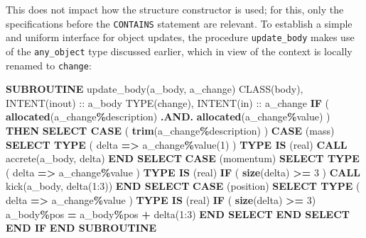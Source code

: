 \documentclass[
  paper=a4,
  ,captions=tableheading
]{scrartcl}
\newenvironment{Shaded}{\begin{snugshade}}{\end{snugshade}}
\newcommand{\DataTypeTok}[1]{\textcolor[rgb]{0.13,0.29,0.53}{#1}}
\newcommand{\DecValTok}[1]{\textcolor[rgb]{0.00,0.00,0.81}{#1}}
\newcommand{\FunctionTok}[1]{\textcolor[rgb]{0.13,0.29,0.53}{\textbf{#1}}}
\newcommand{\KeywordTok}[1]{\textcolor[rgb]{0.13,0.29,0.53}{\textbf{#1}}}
\newcommand{\NormalTok}[1]{#1}
\newcommand{\OperatorTok}[1]{\textcolor[rgb]{0.81,0.36,0.00}{\textbf{#1}}}
\newcommand{\StringTok}[1]{\textcolor[rgb]{0.31,0.60,0.02}{#1}}
\begin{document}
This does not impact how the structure constructor is used; for this,
only the specifications before the \texttt{CONTAINS} statement are
relevant. To establish a simple and uniform interface for object
updates, the procedure \texttt{update\_body} makes use of the
\texttt{any\_object} type discussed earlier, which in view of the
context is locally renamed to \texttt{change}:

\begin{Shaded}
\begin{Highlighting}[]
\KeywordTok{SUBROUTINE}\NormalTok{ update\_body(a\_body, a\_change)}
   \DataTypeTok{CLASS(body)}\NormalTok{, }\DataTypeTok{INTENT(inout)} \DataTypeTok{::}\NormalTok{ a\_body}
   \DataTypeTok{TYPE(change)}\NormalTok{, }\DataTypeTok{INTENT(in)} \DataTypeTok{::}\NormalTok{ a\_change}
   \KeywordTok{IF}\NormalTok{ ( }\FunctionTok{allocated}\NormalTok{(a\_change}\OperatorTok{\%}\NormalTok{description) }\OperatorTok{.AND.} \FunctionTok{allocated}\NormalTok{(a\_change}\OperatorTok{\%}\DataTypeTok{value}\NormalTok{) ) }\KeywordTok{THEN}
     \KeywordTok{SELECT CASE}\NormalTok{ ( }\FunctionTok{trim}\NormalTok{(a\_change}\OperatorTok{\%}\NormalTok{description) )}
     \KeywordTok{CASE}\NormalTok{ (}\StringTok{\textquotesingle{}mass\textquotesingle{}}\NormalTok{)}
        \KeywordTok{SELECT TYPE}\NormalTok{ ( delta }\KeywordTok{=}\OperatorTok{\textgreater{}}\NormalTok{ a\_change}\OperatorTok{\%}\DataTypeTok{value}\NormalTok{(}\DecValTok{1}\NormalTok{) )}
        \KeywordTok{TYPE IS}\NormalTok{ (}\DataTypeTok{real}\NormalTok{)}
           \KeywordTok{CALL}\NormalTok{ accrete(a\_body, delta)}
        \KeywordTok{END SELECT}
     \KeywordTok{CASE}\NormalTok{ (}\StringTok{\textquotesingle{}momentum\textquotesingle{}}\NormalTok{)}
        \KeywordTok{SELECT TYPE}\NormalTok{ ( delta }\KeywordTok{=}\OperatorTok{\textgreater{}}\NormalTok{ a\_change}\OperatorTok{\%}\DataTypeTok{value}\NormalTok{ )}
        \KeywordTok{TYPE IS}\NormalTok{ (}\DataTypeTok{real}\NormalTok{)}
           \KeywordTok{IF}\NormalTok{ ( }\FunctionTok{size}\NormalTok{(delta) }\OperatorTok{\textgreater{}=} \DecValTok{3}\NormalTok{ ) }\KeywordTok{CALL}\NormalTok{ kick(a\_body, delta(}\DecValTok{1}\NormalTok{:}\DecValTok{3}\NormalTok{))}
        \KeywordTok{END SELECT}
     \KeywordTok{CASE}\NormalTok{ (}\StringTok{\textquotesingle{}position\textquotesingle{}}\NormalTok{)}
        \KeywordTok{SELECT TYPE}\NormalTok{ ( delta }\KeywordTok{=}\OperatorTok{\textgreater{}}\NormalTok{ a\_change}\OperatorTok{\%}\DataTypeTok{value}\NormalTok{ )}
        \KeywordTok{TYPE IS}\NormalTok{ (}\DataTypeTok{real}\NormalTok{)}
           \KeywordTok{IF}\NormalTok{ ( }\FunctionTok{size}\NormalTok{(delta) }\OperatorTok{\textgreater{}=} \DecValTok{3}\NormalTok{) a\_body}\OperatorTok{\%}\NormalTok{pos }\KeywordTok{=}\NormalTok{ a\_body}\OperatorTok{\%}\NormalTok{pos }\KeywordTok{+}\NormalTok{ delta(}\DecValTok{1}\NormalTok{:}\DecValTok{3}\NormalTok{)}
        \KeywordTok{END SELECT}
     \KeywordTok{END SELECT}
   \KeywordTok{END IF}
\KeywordTok{END SUBROUTINE}
\end{Highlighting}
\end{Shaded}
\end{document}
